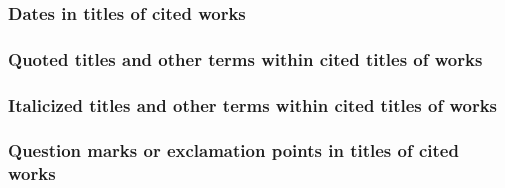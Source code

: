 \documentclass[11pt,letterpaper,oneside]{article}
\begin{document}
\subsubsection{Dates in titles of cited works}

\begin{citebib}
\item \cite{beiser2014}
\end{citebib}

\subsubsection{Quoted titles and other terms within cited titles of works}

\begin{citebib}
\item \cite{levitt2005}
\item \cite{mchugh1980}
\end{citebib}

\subsubsection{Italicized titles and other terms within cited titles of works}

\begin{citebib}
\item \cite{vanwagenen1973}
\end{citebib}

\subsubsection{Question marks or exclamation points in titles of cited works}

\begin{citebib}
\item \cite[63]{berra2002}
\item \cite[183]{oram2007}
\item \cite[778]{tessler2014}
\item \cite[336]{batson1990}
\item \cite[55--56]{berra2002}
\item \cite[184]{oram2007}
\item \cite[780]{tessler2014}
\item \cite[337]{batson1990}
\end{citebib}
\end{document}
